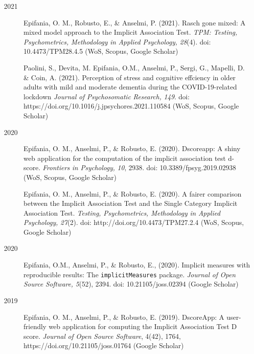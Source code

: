 \documentclass[letterpaper,12pt]{article}
\begin{document}
\begin{description}
	\item[2021] 
	\item[] Epifania, O. M., Robusto, E., \& Anselmi, P. (2021). Rasch gone mixed: A mixed model approach to the Implicit Association Test. \emph{TPM: Testing, Psychometrics, Methodology in Applied Psychology, 28}(4). doi: 10.4473/TPM28.4.5 (WoS, Scopus, Google Scholar)
	\item[] Paolini, S., Devita, M. Epifania, O.M., Anselmi, P., Sergi, G., Mapelli, D. \& Coin, A. (2021). Perception of stress and cognitive effciency in older adults with mild and moderate dementia during the COVID-19-related lockdown \emph{Journal of Psychosomatic Research, 149}. doi: https://doi.org/10.1016/j.jpsychores.2021.110584 (WoS, Scopus, Google Scholar)
	\item [2020]
	\item[] Epifania, O. M., Anselmi, P., \& Robusto, E. (2020). Dscoreapp: A shiny web application for the computation of the implicit association test d-score. \emph{Frontiers in Psychology, 10}, 2938. doi: 10.3389/fpsyg.2019.02938 (WoS, Scopus, Google Scholar)
	\item[] Epifania, O. M., Anselmi, P., \& Robusto, E. (2020). A fairer comparison between the Implicit Association Test and the Single Category Implicit Association Test. \emph{Testing, Psychometrics, Methodology in Applied Psychology, 27}(2). doi: http://doi.org/10.4473/TPM27.2.4 (WoS, Scopus, Google Scholar)
	
	
	\item[2020] 
	\item[] Epifania, O.M., Anselmi, P., \& Robusto, E., (2020). Implicit measures with reproducible results: The \texttt{implicitMeasures} package. \emph{Journal of Open Source Software, 5}(52), 2394. doi: 10.21105/joss.02394 (Google Scholar)
	
	
	\item[2019] 
	\item[] Epifania, O. M., Anselmi, P., \& Robusto, E. (2019). DscoreApp: A user-friendly web application for computing the Implicit Association Test D score. \emph{Journal of Open Source Software}, 4(42), 1764, https://doi.org/10.21105/joss.01764 (Google Scholar)
	
	
	
\end{description}
\end{document}
